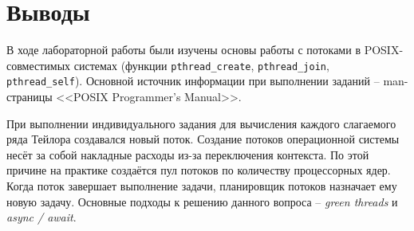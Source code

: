 
\section{Выводы}
\label{sec:conclusion}

В ходе лабораторной работы были изучены основы работы с потоками в POSIX-совместимых системах (функции \lstinline{pthread_create}, \lstinline{pthread_join}, \lstinline{pthread_self}).
Основной источник информации при выполнении заданий -- man-страницы <<POSIX Programmer's Manual>>.

При выполнении индивидуального задания для вычисления каждого слагаемого ряда Тейлора создавался новый поток.
Создание потоков операционной системы несёт за собой накладные расходы из-за переключения контекста. По этой причине на практике создаётся пул потоков по количеству процессорных ядер.
Когда поток завершает выполнение задачи, планировщик потоков назначает ему новую задачу.
Основные подходы к решению данного вопроса -- \textit{green threads} и \textit{async / await}.
